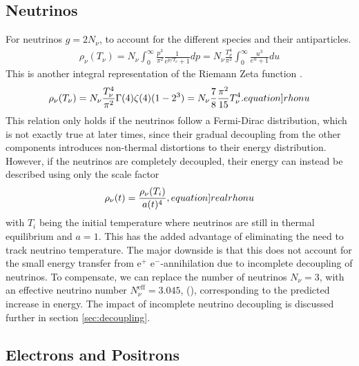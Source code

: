 \subsection{Neutrinos}
\label{sec:rhoNeutrino}
For neutrinos $g=2N_\nu$, to account for the different species and their antiparticles.
\begin{align}
    \rho_\nu(T_\nu)=N_\nu\int_{0}^{\infty} \frac{p^3}{\pi^2}\frac{1}{e^{p/T_\nu}+1}dp =  N_\nu\frac{T_\nu^4}{\pi^2}\int_{0}^{\infty}\frac{u^3}{e^{u}+1}du
\end{align}
This is another integral representation of the Riemann Zeta function \cite[\href{https://dlmf.nist.gov/25.5.E3}{(25.5.3)}]{NIST:DLMF}.
\begin{align}
    \rho_\nu(T_\nu)=N_\nu\frac{T_\nu^4}{\pi^2}\Gamma(4)\zeta(4)(1-2^3)=N_\nu\frac{7}{8}\frac{\pi^2}{15}T_\nu^4.
    \label[equation]{rhonu}
\end{align}
This relation only holds if the neutrinos follow a Fermi-Dirac distribution, which is not exactly true at later times, since their gradual decoupling from the other components introduces non-thermal distortions to their energy distribution. However, if the neutrinos are completely decoupled, their energy can instead be described using only the scale factor 
\begin{align}
    \rho_\nu(t)=\frac{\rho_\nu(T_i)}{a(t)^4},
    \label[equation]{realrhonu}
\end{align}
with $T_i$ being the initial temperature where neutrinos are still in thermal equilibrium and $a=1$. This has the added advantage of eliminating the need to track neutrino temperature. The major downside is that this does not account for the small energy transfer from e${^+}$ e${^-}$-annihilation due to incomplete decoupling of neutrinos. To compensate, we can replace the number of neutrinos $N_\nu=3$, with an effective neutrino number $N_\nu^\text{eff}=3.045$, (\textcite{de_Salas_2016}), corresponding to the predicted increase in energy. The impact of incomplete neutrino decoupling is discussed further in section \ref{sec:decoupling}.




\subsection{Electrons and Positrons}


